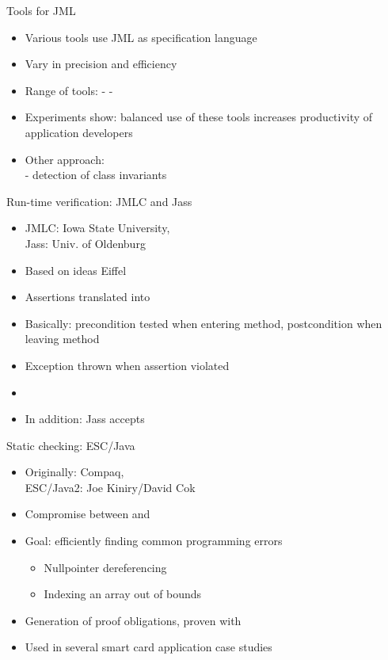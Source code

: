 \documentclass[final,nocolorBG,a4,marieke,nototal,pdf, accumulate,slideColor]{prosper}
\begin{document}
\begin{slide}{Tools for JML}
\begin{itemize}
\item Various tools use JML as specification language
\item Vary in precision and efficiency
\item Range of tools:  -  - 
\item Experiments show: balanced use of these tools increases
productivity of application developers   
\item Other approach: \\
  - detection of class invariants
\end{itemize}
\end{slide}

\begin{slide}{Run-time verification: JMLC and Jass}
\begin{itemize}
\item JMLC: Iowa State University,\\ Jass: Univ. of Oldenburg
\item Based on ideas Eiffel
\item Assertions translated into 
\item Basically: precondition tested when entering method,
postcondition when leaving method
\item Exception thrown when assertion violated
\item {}
\item In addition: Jass accepts 
\end{itemize}
\end{slide}

\begin{slide}{Static checking: ESC/Java}
\begin{itemize}
\item Originally: Compaq, \\
      ESC/Java2: Joe Kiniry/David Cok
\item Compromise between  and 
\item Goal: efficiently finding common programming errors
  \begin{itemize}
     \item Nullpointer dereferencing
     \item Indexing an array out of bounds
  \end{itemize}
\item Generation of proof obligations, proven with 
\item Used in several smart card application case studies 
\end{itemize}
\end{slide}
\end{document}
